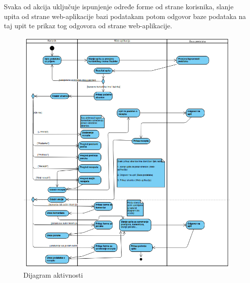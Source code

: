 		\noindent Svaka od akcija uključuje ispunjenje određe forme od strane korisnika, slanje upita od strane web-aplikacije
		bazi podatakam potom odgovor baze podataka na taj upit te prikaz tog odgovora od strane web-aplikacije.

		\eject

		\begin{figure}[H]
			\includegraphics[scale=0.6]{dijagrami/dijagram_aktivnosti.png}
			\centering
			\caption{Dijagram aktivnosti}
			\label{fig:bpdiag}
		\end{figure}
		\eject